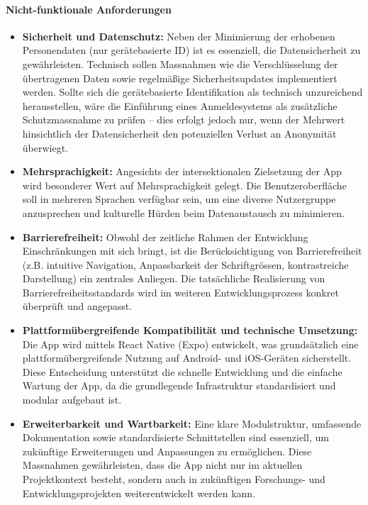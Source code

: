 \paragraph{Nicht-funktionale Anforderungen}
\begin{itemize}
    \item \textbf{Sicherheit und Datenschutz:}  
    Neben der Minimierung der erhobenen Personendaten (nur gerätebasierte ID) ist es essenziell, die Datensicherheit zu gewährleisten. Technisch sollen Massnahmen wie die Verschlüsselung der übertragenen Daten sowie regelmäßige Sicherheitsupdates implementiert werden. Sollte sich die gerätebasierte Identifikation als technisch unzureichend herausstellen, wäre die Einführung eines Anmeldesystems als zusätzliche Schutzmassnahme zu prüfen – dies erfolgt jedoch nur, wenn der Mehrwert hinsichtlich der Datensicherheit den potenziellen Verlust an Anonymität überwiegt.

    \item \textbf{Mehrsprachigkeit:}  
    Angesichts der intersektionalen Zielsetzung der App wird besonderer Wert auf Mehrsprachigkeit gelegt. Die Benutzeroberfläche soll in mehreren Sprachen verfügbar sein, um eine diverse Nutzergruppe anzusprechen und kulturelle Hürden beim Datenaustausch zu minimieren.

    \item \textbf{Barrierefreiheit:}  
    Obwohl der zeitliche Rahmen der Entwicklung Einschränkungen mit sich bringt, ist die Berücksichtigung von Barrierefreiheit (z.B. intuitive Navigation, Anpassbarkeit der Schriftgrössen, kontrastreiche Darstellung) ein zentrales Anliegen. Die tatsächliche Realisierung von Barrierefreiheitsstandards wird im weiteren Entwicklungsprozess konkret überprüft und angepasst.

    \item \textbf{Plattformübergreifende Kompatibilität und technische Umsetzung:}  
    Die App wird mittels React Native (Expo) entwickelt, was grundsätzlich eine plattformübergreifende Nutzung auf Android- und iOS-Geräten sicherstellt. Diese Entscheidung unterstützt die schnelle Entwicklung und die einfache Wartung der App, da die grundlegende Infrastruktur standardisiert und modular aufgebaut ist.

    \item \textbf{Erweiterbarkeit und Wartbarkeit:}  
    Eine klare Modulstruktur, umfassende Dokumentation sowie standardisierte Schnittstellen sind essenziell, um zukünftige Erweiterungen und Anpassungen zu ermöglichen. Diese Massnahmen gewährleisten, dass die App nicht nur im aktuellen Projektkontext besteht, sondern auch in zukünftigen Forschungs- und Entwicklungsprojekten weiterentwickelt werden kann.
\end{itemize}

